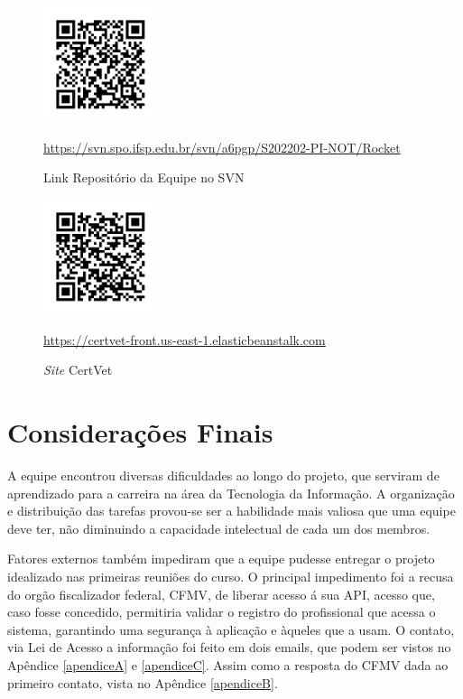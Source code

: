 \documentclass[
    12pt,               %
    openright,          %
    oneside,
    a4paper,            %
    BIBLATEX,           %
    TODO,               %
    english,            %
    brazil              %
    ]{ifsp-spo-inf-ctds}
\begin{document}
    \begin{figure}[htb!]
        \centering
        \includegraphics[width=0.3\textwidth]{qrcode/svn.png}
        \caption{Link Repositório da Equipe no SVN}
        {\footnotesize \url{https://svn.spo.ifsp.edu.br/svn/a6pgp/S202202-PI-NOT/Rocket}}
        \label{fig:svn}
    \end{figure}
    
   
    \begin{figure}[htb!]
         \centering
         \includegraphics[width=0.3\textwidth]{qrcode/qrcode_SITE.png}
         \caption{\emph{Site} CertVet}
         {\footnotesize \url{https://certvet-front.us-east-1.elasticbeanstalk.com}}
         \label{fig:linksite}
    \end{figure}   


\chapter[Considerações Finais]{Considerações Finais}

    A equipe encontrou diversas dificuldades ao longo do projeto, que serviram de aprendizado para a carreira na área da Tecnologia da Informação.
    A organização e distribuição das tarefas provou-se ser a habilidade mais valiosa que uma equipe deve ter, não diminuindo a capacidade intelectual de cada um dos membros. 
    
    Fatores externos também impediram que a equipe pudesse entregar o projeto idealizado nas primeiras reuniões do curso. O principal impedimento foi a recusa do orgão fiscalizador federal, CFMV, de liberar acesso á sua API, acesso que, caso fosse concedido, permitiria validar o registro do profissional que acessa o sistema, garantindo uma segurança à aplicação e àqueles que a usam. O contato, via Lei de Acesso a informação foi feito em dois emails, que podem ser vistos no Apêndice \ref{apendiceA}  e \ref{apendiceC}. Assim como a resposta do CFMV dada ao primeiro contato, vista no Apêndice \ref{apendiceB}.
    
\end{document}
